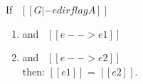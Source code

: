 \begin{comment}
\begin{proof}
By induction on typing relation.
  \begin{itemize}
    \item Cases \rref{typ-int, typ-var, typ-app, typ-sub, typ-abs} are trivial to prove.
    \item Case \rref{typ-anno} requires \cref{lemma:union:value-not-value}.
    \item Case \rref{typ-typeof} requires 
    \cref{lemma:union:check-pexpr-ann,lemma:union:check-or-typ,lemma:union:pexpr-inf-typ}.
  \end{itemize}
\end{proof}

\begin{lemma}[Value Decidability]
\label{lemma:union:value-not-value}
$\forall$ $[[e]]$, \ value \ $[[e]]$ \ $\vee$ \ $\neg$ value \ $[[e]]$.
\end{lemma}

\begin{lemma}[check-or-typ]
\label{lemma:union:check-or-typ}
If \ $[[A *s B]]$ \ and \ $[[G |- p <= A \/ B]]$ \ then:
  \begin{enumerate}
    \item either \ $[[G |- p <= A]]$
    \item or \ $[[G |- p <= B]]$
  \end{enumerate}
\end{lemma}

\begin{lemma}[pexpr-inf-typ]
\label{lemma:union:pexpr-inf-typ}
If \ $[[G |- p <= A]]$ \ then:
  \begin{enumerate}
  \item $\exists$ $[[B]]$, \ $[[B <: A]]$
  \item and \ $[[G |- p => B]]$
  \end{enumerate}
\end{lemma}
\end{comment}

\begin{lemma}[Determinism]
\label{lemma:union:determinism}
  If \ $[[G |- e dirflag A]]$
  \begin{enumerate}
  \item and \ $[[e --> e1]]$
  \item and \ $[[e --> e2]]$ \\
  then: $[[e1]]$ = $[[e2]]$.
  \end{enumerate}
\end{lemma}

